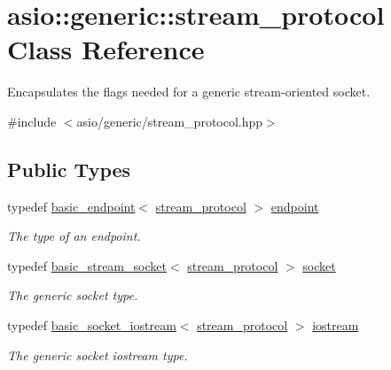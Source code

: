 \hypertarget{classasio_1_1generic_1_1stream__protocol}{}\section{asio\+:\+:generic\+:\+:stream\+\_\+protocol Class Reference}
\label{classasio_1_1generic_1_1stream__protocol}


Encapsulates the flags needed for a generic stream-\/oriented socket.  




{\ttfamily \#include $<$asio/generic/stream\+\_\+protocol.\+hpp$>$}

\subsection*{Public Types}
\begin{DoxyCompactItemize}
\item 
typedef \hyperlink{classasio_1_1generic_1_1basic__endpoint}{basic\+\_\+endpoint}$<$ \hyperlink{classasio_1_1generic_1_1stream__protocol}{stream\+\_\+protocol} $>$ \hyperlink{classasio_1_1generic_1_1stream__protocol_a2217db3a8791fa9c28a340b877d2ef0f}{endpoint}
\begin{DoxyCompactList}\small\item\em The type of an endpoint. \end{DoxyCompactList}\item 
typedef \hyperlink{classasio_1_1basic__stream__socket}{basic\+\_\+stream\+\_\+socket}$<$ \hyperlink{classasio_1_1generic_1_1stream__protocol}{stream\+\_\+protocol} $>$ \hyperlink{classasio_1_1generic_1_1stream__protocol_abff2e68a3458693a14e871b1f94a850c}{socket}
\begin{DoxyCompactList}\small\item\em The generic socket type. \end{DoxyCompactList}\item 
typedef \hyperlink{classasio_1_1basic__socket__iostream}{basic\+\_\+socket\+\_\+iostream}$<$ \hyperlink{classasio_1_1generic_1_1stream__protocol}{stream\+\_\+protocol} $>$ \hyperlink{classasio_1_1generic_1_1stream__protocol_a8c47df8acd5a63bd939cef41beaf202d}{iostream}
\begin{DoxyCompactList}\small\item\em The generic socket iostream type. \end{DoxyCompactList}\end{DoxyCompactItemize}

